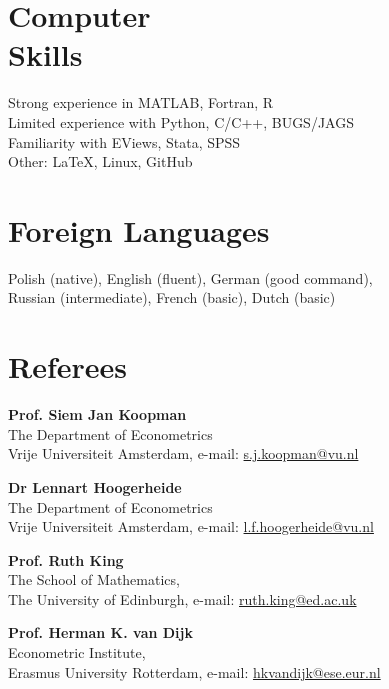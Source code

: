 \documentclass[margin,line]{resume}
\begin{document}
\begin{resume}


 



   \section{\mysidestyle Computer\\ Skills} 
   Strong experience in MATLAB, Fortran, R   \vspace{1mm}\\
   Limited experience with Python, C/C++, BUGS/JAGS \vspace{1mm}\\
	Familiarity with EViews, Stata, SPSS \vspace{1mm} \\
	Other: \LaTeX, Linux, GitHub  

   \section{\mysidestyle Foreign Languages}  
	Polish (native), English (fluent),  German (good command),    \\
    Russian (intermediate),  French (basic),  Dutch (basic)

 
    
\section{\mysidestyle Referees} 

 \textbf{Prof. Siem Jan Koopman} \\    
 The Department of Econometrics \\
 Vrije Universiteit Amsterdam, e-mail: \url{s.j.koopman@vu.nl}

 \textbf{Dr Lennart Hoogerheide} \\  
 The Department of Econometrics \\  
 Vrije Universiteit Amsterdam, e-mail: \url{l.f.hoogerheide@vu.nl}

 \textbf{Prof. Ruth King} \\  
 The School of Mathematics,\\  
 The University of Edinburgh, e-mail: \url{ruth.king@ed.ac.uk}
 
 \textbf{Prof. Herman K. van Dijk} \\  
 Econometric Institute,\\  
 Erasmus University Rotterdam, e-mail: \url{hkvandijk@ese.eur.nl }
\end{resume}
\end{document}
